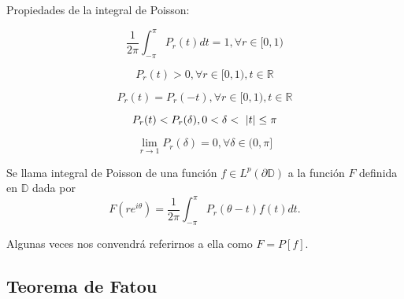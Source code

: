 \bigskip

Propiedades de la integral de Poisson:

\begin{equation}
\dfrac{1}{2 \pi} \int_{- \pi}^{\pi} P_r (t) dt = 1, \forall r \in [0,1)
\end{equation}

\begin{equation}
P_r(t) > 0, \forall r \in [0,1), t \in \mathbb{R}
\end{equation}

\begin{equation}
P_r(t) = P_r(-t), \forall r \in [0,1), t \in \mathbb{R}
\end{equation}

\begin{equation}
P_r(t) < P_r(\delta), 0 < \delta < \abs{t} \leq \pi
\end{equation}

\begin{equation}
\lim_{r \rightarrow 1} P_r(\delta) = 0, \forall \delta \in (0,\pi]
\end{equation}

\medskip

\begin{definition}
Se llama integral de Poisson de una función $f \in L^p(\partial \mathbb{D})$ a la función $F$ definida en $\mathbb{D}$ dada por
\begin{equation*}
F(re^{i \theta}) = \dfrac{1}{2 \pi} \int_{- \pi}^{\pi} P_r (\theta - t) f(t) dt.
\end{equation*}

Algunas veces nos convendrá referirnos a ella como $F=P[f]$.
\end{definition}

\subsection{Teorema de Fatou}

